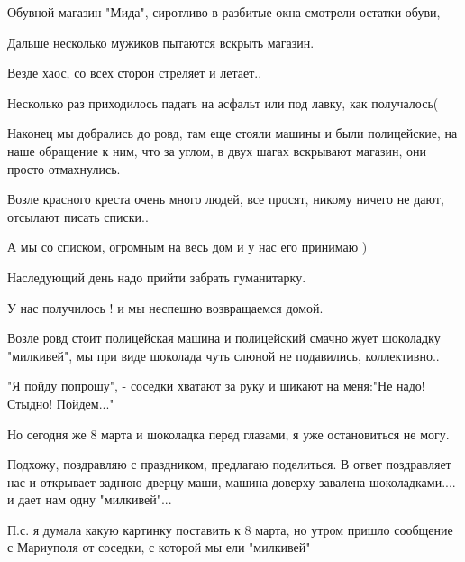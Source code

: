 Обувной магазин "Мида", сиротливо в разбитые окна смотрели остатки обуви,

Дальше  несколько мужиков пытаются вскрыть магазин.

Везде хаос, со всех сторон стреляет и летает..

Несколько раз приходилось падать на асфальт или под лавку, как получалось(

Наконец мы добрались до ровд,  там еще стояли машины и были полицейские, на
наше обращение к ним,  что за углом, в двух шагах вскрывают магазин, они
просто отмахнулись.

Возле красного креста очень много людей, все просят, никому ничего не дают,
отсылают писать списки..

А мы со списком, огромным на весь дом и у нас его принимаю )

Наследующий день надо прийти  забрать гуманитарку.

У нас получилось ! и мы неспешно возвращаемся домой.

Возле ровд стоит полицейская машина и полицейский смачно жует шоколадку
"милкивей", мы при виде шоколада чуть слюной не подавились, коллективно..

"Я пойду попрошу", - соседки хватают за руку и шикают на меня:"Не
надо! Стыдно! Пойдем..."

Но сегодня же 8 марта   и шоколадка перед глазами, я уже остановиться не могу.

Подхожу, поздравляю с праздником, предлагаю поделиться. В ответ поздравляет
нас и открывает заднюю дверцу маши, машина доверху завалена шоколадками.... и
дает нам одну "милкивей"...

П.с. я думала какую картинку поставить к 8 марта, но утром пришло сообщение с
Мариуполя  от соседки, с которой мы ели "милкивей"🍫

